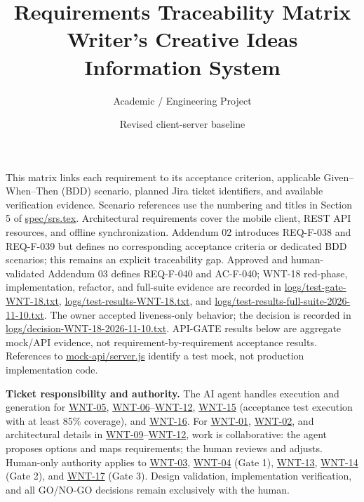 \documentclass[10pt,a4paper]{article}
\title{Requirements Traceability Matrix\\[0.3em]
\large Writer's Creative Ideas Information System}
\author{Academic / Engineering Project}
\date{Revised client-server baseline}
\renewcommand{\texttt}[1]{\url{#1}}
\begin{document}
\maketitle

This matrix links each requirement to its acceptance criterion, applicable Given--When--Then (BDD) scenario, planned Jira ticket identifiers, and available verification evidence. Scenario references use the numbering and titles in Section 5 of \texttt{spec/srs.tex}. Architectural requirements cover the mobile client, REST API resources, and offline synchronization. Addendum 02 introduces REQ-F-038 and REQ-F-039 but defines no corresponding acceptance criteria or dedicated BDD scenarios; this remains an explicit traceability gap. Approved and human-validated Addendum 03 defines REQ-F-040 and AC-F-040; WNT-18 red-phase, implementation, refactor, and full-suite evidence are recorded in \texttt{logs/test-gate-WNT-18.txt}, \texttt{logs/test-results-WNT-18.txt}, and \texttt{logs/test-results-full-suite-2026-11-10.txt}. The owner accepted liveness-only behavior; the decision is recorded in \texttt{logs/decision-WNT-18-2026-11-10.txt}. API-GATE results below are aggregate mock/API evidence, not requirement-by-requirement acceptance results. References to \texttt{mock-api/server.js} identify a test mock, not production implementation code.

\textbf{Ticket responsibility and authority.} The AI agent handles execution and generation for \texttt{WNT-05}, \texttt{WNT-06}--\texttt{WNT-12}, \texttt{WNT-15} (acceptance test execution with at least 85\% coverage), and \texttt{WNT-16}. For \texttt{WNT-01}, \texttt{WNT-02}, and architectural details in \texttt{WNT-09}--\texttt{WNT-12}, work is collaborative: the agent proposes options and maps requirements; the human reviews and adjusts. Human-only authority applies to \texttt{WNT-03}, \texttt{WNT-04} (Gate 1), \texttt{WNT-13}, \texttt{WNT-14} (Gate 2), and \texttt{WNT-17} (Gate 3). Design validation, implementation verification, and all GO/NO-GO decisions remain exclusively with the human.
\end{document}
